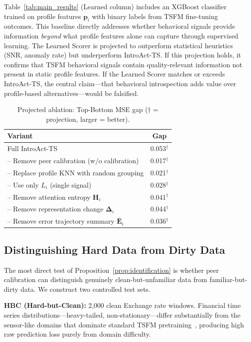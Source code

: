 \documentclass{article}
\begin{document}
Table~\ref{tab:main_results} (Learned column) includes an XGBoost classifier trained on profile features $\mathbf{p}_i$ with binary labels from TSFM fine-tuning outcomes. This baseline directly addresses whether behavioral signals provide information \emph{beyond} what profile features alone can capture through supervised learning. The Learned Scorer is projected to outperform statistical heuristics (SNR, anomaly rate) but underperform IntroAct-TS. If this projection holds, it confirms that TSFM behavioral signals contain quality-relevant information not present in static profile features. If the Learned Scorer matches or exceeds IntroAct-TS, the central claim---that behavioral introspection adds value over profile-based alternatives---would be falsified.

\begin{table}[t]
\centering
\caption{Projected ablation: Top-Bottom MSE gap ($\dagger$ = projection, larger = better).}
\label{tab:ablation}
\begin{tabular}{lc}
\toprule
\textbf{Variant} & \textbf{Gap} \\
\midrule
Full IntroAct-TS & 0.053$^\dagger$ \\
-- Remove peer calibration (w/o calibration) & 0.017$^\dagger$ \\
-- Replace profile KNN with random grouping & 0.021$^\dagger$ \\
-- Use only $L_i$ (single signal) & 0.028$^\dagger$ \\
-- Remove attention entropy $\mathbf{H}_i$ & 0.041$^\dagger$ \\
-- Remove representation change $\boldsymbol{\Delta}_i$ & 0.044$^\dagger$ \\
-- Remove error trajectory summary $\bar{\mathbf{E}}_i$ & 0.036$^\dagger$ \\
\bottomrule
\end{tabular}
\end{table}

\subsection{Distinguishing Hard Data from Dirty Data}

\label{sec:hard_vs_dirty}

The most direct test of Proposition~\ref{prop:identification} is whether peer calibration can distinguish genuinely clean-but-unfamiliar data from familiar-but-dirty data. We construct two controlled test sets.

\textbf{HBC (Hard-but-Clean):} 2,000 clean Exchange rate windows. Financial time series distributions---heavy-tailed, non-stationary---differ substantially from the sensor-like domains that dominate standard TSFM pretraining~\citep{woo2024moirai, das2024timesfm}, producing high raw prediction loss purely from domain difficulty.
\end{document}
